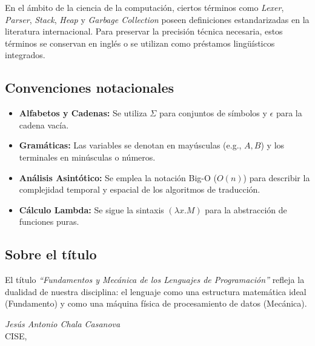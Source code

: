 En el ámbito de la ciencia de la computación, ciertos términos como \textit{Lexer}, \textit{Parser}, \textit{Stack}, \textit{Heap} y \textit{Garbage Collection} poseen definiciones estandarizadas en la literatura internacional. Para preservar la precisión técnica necesaria, estos términos se conservan en inglés o se utilizan como préstamos lingüísticos integrados.

\subsection*{Convenciones notacionales}

\begin{itemize}
  \item \textbf{Alfabetos y Cadenas:} Se utiliza $\Sigma$ para conjuntos de símbolos y $\epsilon$ para la cadena vacía.
  \item \textbf{Gramáticas:} Las variables se denotan en mayúsculas (e.g., $A, B$) y los terminales en minúsculas o números.
  \item \textbf{Análisis Asintótico:} Se emplea la notación Big-O ($O(n)$) para describir la complejidad temporal y espacial de los algoritmos de traducción.
  \item \textbf{Cálculo Lambda:} Se sigue la sintaxis $(\lambda x.M)$ para la abstracción de funciones puras.
\end{itemize}

\subsection*{Sobre el título}

El título \textit{``Fundamentos y Mecánica de los Lenguajes de Programación''} refleja la dualidad de nuestra disciplina: el lenguaje como una estructura matemática ideal (Fundamento) y como una máquina física de procesamiento de datos (Mecánica).

\vspace{1.2cm}
\begin{flushright}
\textit{Jesús Antonio Chala Casanova}\\[2pt]
CISE, \the\year
\end{flushright}